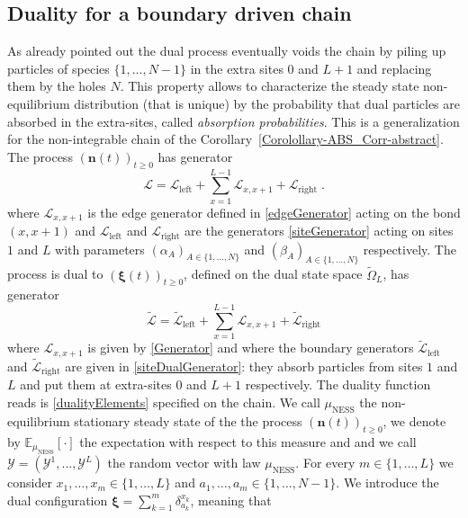 \documentclass[10pt]{article}
\numberwithin{equation}{section}
\numberwithin{equation}{subsection}
\newcommand{\dt}{\;.}
\begin{document}
\subsection{Duality for a boundary driven chain}\label{Subsection-ss-nonI}
 As already pointed out the dual process eventually voids the chain by piling up particles of species $\{1,\ldots,N-1\}$ in the extra sites $0$ and $L+1$ and replacing them by the holes $N$. This property allows to characterize the steady state non-equilibrium distribution (that is unique) by the probability that dual particles are absorbed in the extra-sites, called \textit{absorption probabilities}. This is a generalization for the non-integrable chain of the Corollary~\ref{Corolollary-ABS_Corr-abstract}. The process $\left(\bm{n}(t)\right)_{t\geq0}$ has generator
\begin{equation}
	\mathcal{L}=\mathcal{L}_{\text{left}}+\sum_{x=1}^{L-1}\mathcal{L}_{x,x+1}+\mathcal{L}_{\text{right}}\dt
\end{equation} 
where $\mathcal{L}_{x,x+1}$ is the edge generator defined in \eqref{edgeGenerator} acting on the bond $(x,x+1)$ and $\mathcal{L}_{\text{left}}$ and $\mathcal{L}_{\text{right}}$ are the generators \eqref{siteGenerator} acting on sites $1$ and $L$ with parameters $(\alpha_{A})_{A\in \{1,\ldots,N\}}$ and $(\beta_{A})_{A\in \{1,\ldots,N\}}$ respectively. 
The process is dual to $(\bm{\xi}(t))_{t\geq0}$, defined on the dual state space $\widetilde{\Omega}_{L}$, has generator
\begin{equation}
	\widetilde{\mathcal{L}}=\widetilde{\mathcal{L}}_{\text{left}}+\sum_{x=1}^{L-1}\mathcal{L}_{x,x+1}+\widetilde{\mathcal{L}}_{\text{right}}
\end{equation} 
where $\mathcal{L}_{x,x+1}$ is given by \eqref{Generator} and where the boundary generators $\widetilde{\mathcal{L}}_{\text{left}}$ and $\widetilde{\mathcal{L}}_{\text{right}}$ are given in \eqref{siteDualGenerator}: they absorb particles from sites $1$ and $L$ and put them at extra-sites $0$ and $L+1$ respectively. The duality function reads is \eqref{dualityElements} specified on the chain. 
We call $\mu_{\text{NESS}}$ the non-equilibrium stationary steady state of the the process $(\bm{n}(t))_{t\geq 0}$, we denote by $\mathbb{E}_{\mu_{\text{NESS}}}[\cdot]$ the expectation with respect to this measure and and we call $\bm{\mathcal{Y}} = (\mathcal{Y}^{1},\ldots,\mathcal{Y}^{L})$ the random vector with law $\mu_{\text{NESS}}$. For every $m\in\{1,\ldots,L\}$ we consider  $x_{1},\ldots,x_{m}\in\{1,\ldots,L\}$ and $a_{1},\ldots,a_{m}\in \{1,\ldots,N-1\}$. We introduce the dual configuration  $\bm{\xi}=\sum_{k=1}^{m}\delta_{a_{k}}^{x_{k}}$, meaning that 
\end{document}
